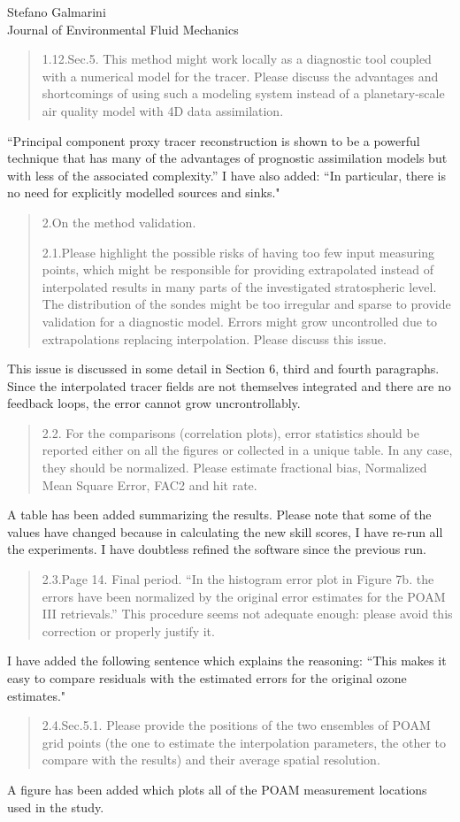 \documentclass{letter}
\begin{document}
\begin{letter}{Stefano Galmarini\\
Journal of Environmental Fluid Mechanics}
\begin{quote}
1.12.Sec.5. This method might work locally as a diagnostic tool coupled with a numerical model for the tracer. Please discuss the advantages and shortcomings of using such a modeling system instead of a planetary-scale air quality model with 4D data assimilation.
\end{quote}
``Principal component proxy tracer reconstruction is shown to be a powerful
technique that 
has many of the advantages of prognostic assimilation models but with
less of the associated complexity.'' I have also added:
``In particular, there is no need for explicitly modelled sources and sinks."
\begin{quote}
2.On the method validation.

2.1.Please highlight the possible risks of having too few input measuring points, which might be responsible for providing extrapolated instead of interpolated results in many parts of the investigated stratospheric level. The distribution of the sondes might be too irregular and sparse to provide validation for a diagnostic model. Errors might grow uncontrolled due to extrapolations replacing interpolation. Please discuss this issue.
\end{quote}
This issue is discussed in some detail in Section 6, third and fourth
paragraphs.
Since the interpolated tracer fields are not themselves integrated and there are no feedback loops, the error
cannot grow uncrontrollably.
\begin{quote}
2.2. For the comparisons (correlation plots), error statistics should be reported either on all the figures or collected in a unique table. In any case, they should be normalized. Please estimate fractional bias, Normalized Mean Square Error, FAC2 and hit rate.
\end{quote}
A table has been added summarizing the results.
Please note that some of the values have changed because in calculating the
new skill scores, I have re-run all the experiments. I have doubtless refined
the software since the previous run.
\begin{quote}
2.3.Page 14. Final period. ``In the histogram error plot in Figure 7b. the errors have been normalized by the original error estimates for the POAM III retrievals.'' This procedure seems not adequate enough: please avoid this correction or properly justify it.
\end{quote}
I have added the following sentence which explains the reasoning:
``This makes it easy to compare residuals with the estimated errors
for the original ozone estimates."
\begin{quote}
2.4.Sec.5.1. Please provide the positions of the two ensembles of POAM grid points (the one to estimate the interpolation parameters, the other to compare with the results) and their average spatial resolution.
\end{quote}
A figure has been added which plots all of the POAM measurement locations used
in the study.


\end{letter}
\end{document}
